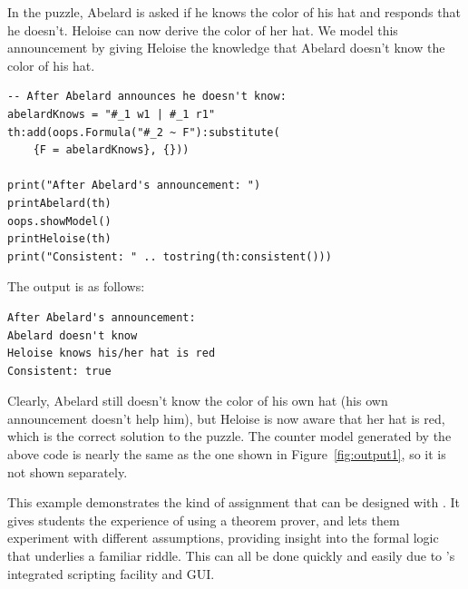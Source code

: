 In the puzzle, Abelard is asked if he knows the color of his hat and responds that he doesn't. Heloise can now derive the color of her hat. We model this announcement by giving Heloise the knowledge that Abelard doesn't know the color of his hat.
\begin{lstlisting}
-- After Abelard announces he doesn't know:
abelardKnows = "#_1 w1 | #_1 r1"
th:add(oops.Formula("#_2 ~ F"):substitute(
    {F = abelardKnows}, {}))

print("After Abelard's announcement: ")
printAbelard(th)
oops.showModel()
printHeloise(th)
print("Consistent: " .. tostring(th:consistent()))
\end{lstlisting}
The output is as follows:
\lstset{language=}
\begin{lstlisting}
After Abelard's announcement:
Abelard doesn't know
Heloise knows his/her hat is red
Consistent: true
\end{lstlisting}
\lstset{language=lua}
Clearly, Abelard still doesn't know the color of his own hat (his own announcement doesn't help him), but Heloise is now aware that her hat is red, which is the correct solution to the puzzle.
The counter model generated by the above code is nearly the same as the one shown in Figure~\ref{fig:output1}, so it is not shown separately.

This example demonstrates the kind of assignment that can be designed with  \oops\/.
It gives students the experience of using a theorem prover, and lets them experiment with different assumptions, providing insight into the formal logic that underlies a familiar riddle.
This can all be done quickly and easily due to \oops's integrated scripting facility and GUI.
